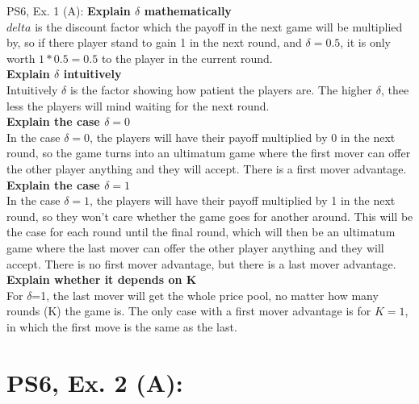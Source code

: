\begin{frame}{PS6, Ex. 1 (A): }
    \textbf{Explain $\delta$ mathematically\\}
    $delta$ is the discount factor which the payoff in the next game will be multiplied by, so if there player stand to gain 1 in the next round, and $\delta=0.5$, it is only worth $1*0.5=0.5$ to the player in the current round.\\
    \textbf{Explain $\delta$ intuitively}\\ Intuitively $\delta$ is the factor showing how patient the players are. The higher $\delta$, thee less the players will mind waiting for the next round.  \\
    \textbf{Explain the case $\delta=0$}\\
    In the case $\delta=0$, the players will have their payoff multiplied by 0 in the next round, so the game turns into an ultimatum game where the first mover can offer the other player anything and they will accept. There is a first mover advantage. \\
    \textbf{Explain the case $\delta=1$}\\
    In the case $\delta=1$, the players will have their payoff multiplied by 1 in the next round, so they won't care whether the game goes for another around. This will be the case for each round until the final round, which will then be an ultimatum game where the last mover can offer the other player anything and they will accept. There is no first mover advantage, but there is a last mover advantage. \\
    \textbf{Explain whether it depends on K}\\
    For $\delta$=1, the last mover will get the whole price pool, no matter how many rounds (K) the game is. The only case with a first mover advantage is for $K=1$, in which the first move is the same as the last.\\
    \vfill\null
\end{frame}

\section{PS6, Ex. 2 (A): }

